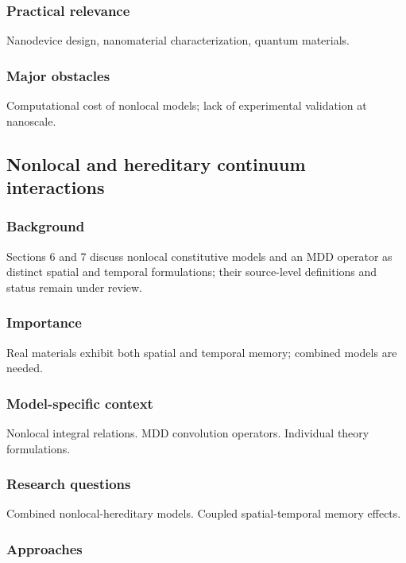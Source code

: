 \subsubsection{Practical relevance}

Nanodevice design, nanomaterial characterization, quantum materials.

\subsubsection{Major obstacles}

Computational cost of nonlocal models; lack of experimental validation at nanoscale.

\subsection{Nonlocal and hereditary continuum interactions}
\label{sec:nonlocal-hereditary}

\subsubsection{Background}

Sections 6 and 7 discuss nonlocal constitutive models and an MDD operator as distinct spatial and temporal formulations; their source-level definitions and status remain under review.

\subsubsection{Importance}

Real materials exhibit both spatial and temporal memory; combined models are needed.

\subsubsection{Model-specific context}

Nonlocal integral relations. MDD convolution operators. Individual theory formulations.

\subsubsection{Research questions}

Combined nonlocal-hereditary models. Coupled spatial-temporal memory effects.

\subsubsection{Approaches}

